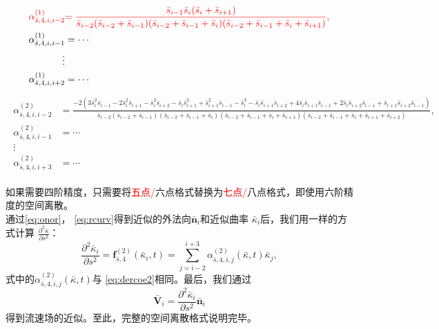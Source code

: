 \documentclass[a4paper,twoside]{ctexart}
\begin{document}
  \begin{footnotesize}
    \begin{eqnarray}
    \begin{aligned}
      \label{eq:dercoe1}      
  {\color{red} \alpha_{\bar{s},4,i,i-2}^{(1)} }&{\color{red} =
  \frac{\bar{s}_{i-1}\bar{s}_{i}(\bar{s}_{i}+\bar{s}_{i+1})}{\bar{s}_{i-2}(\bar{s}_{i-2}+\bar{s}_{i-1})(\bar{s}_{i-2}+\bar{s}_{i-1}+\bar{s}_{i})(\bar{s}_{i-2}+\bar{s}_{i-1}+\bar{s}_{i}+\bar{s}_{i+1})},}
  \\
  \alpha_{\bar{s},4,i,i-1}^{(1)} &= \cdots\\
  \vdots\\
  \alpha_{\bar{s},4,i,i+2}^{(1)} &= \cdots
\end{aligned}
  \end{eqnarray}
\begin{eqnarray}
\begin{aligned}
      \label{eq:dercoe2}
  \alpha_{\bar{s},4,i,i-2}^{(2)} &=
  \frac{-2(3\bar{s}_{i}^2\bar{s}_{i-1}\! -\!2\bar{s}_{i}^2\bar{s}_{i+1}\! -\!\bar{s}_{i}^2\bar{s}_{i+2}\! -\!\bar{s}_{i}\bar{s}_{i+1}^2\! +\!\bar{s}_{i+1}^2\bar{s}_{i-1}\! -\!\bar{s}_{i}^3\! -\!\bar{s}_{i}\bar{s}_{i+1}\bar{s}_{i+2}\! +\!4\bar{s}_{i}\bar{s}_{i+1}\bar{s}_{i-1}\! +\!2\bar{s}_{i}\bar{s}_{i+2}\bar{s}_{i-1}\! +\!\bar{s}_{i+1}\bar{s}_{i+2}\bar{s}_{i-1})}{\bar{s}_{i-2}(\bar{s}_{i-2}+\bar{s}_{i-1})(\bar{s}_{i-2}+\bar{s}_{i-1}+\bar{s}_{i})(\bar{s}_{i-2}+\bar{s}_{i-1}+\bar{s}_{i}+\bar{s}_{i+1})(\bar{s}_{i-2}+\bar{s}_{i-1}+\bar{s}_{i}+\bar{s}_{i+1}+\bar{s}_{i+2})},
  \\
  \alpha_{\bar{s},4,i,i-1}^{(2)} &= \cdots\\
  \vdots\\
  \alpha_{\bar{s},4,i,i+3}^{(2)} &= \cdots
  \end{aligned}                               
\end{eqnarray}
\end{footnotesize}
\indent 如果需要四阶精度，只需要将\textcolor{red}{五点/}六点格式替换为\textcolor{red}{七点/}八点格式，即使用六阶精度的空间离散。\\
\indent 通过\eqref{eq:onor}，
  \eqref{eq:rcurv}得到近似的外法向$\bar{\boldsymbol n}_i$和近似曲率
  $\bar{\kappa}_i$后，我们用一样的方式计算
  $\frac{\partial^2\kappa}{\partial s^2}$：
  \begin{equation}
    \label{eq:calderkappa}
    \frac{\partial^2\bar{\kappa}_i}{\partial s^2} =
    \boldsymbol f_{\bar{s},4}^{(2)}(\bar{\kappa}_i,t) = \sum_{j=i-2}^{i+3}\alpha_{\bar{s},4,i,j}^{(2)}(\bar{\kappa},t) \bar{\kappa}_j,
  \end{equation}
  式中的$\alpha_{\bar{s},4,i,j}^{(2)}(\bar{\kappa},t)$与
  \eqref{eq:dercoe2}相同。最后，我们通过
  \begin{equation}
    \label{eq:calv}
    \bar{\boldsymbol V}_i = \frac{\partial^2\bar{\kappa}_i}{\partial s^2}
    \bar{\boldsymbol n}_i
  \end{equation}
  得到流速场的近似。至此，完整的空间离散格式说明完毕。
\end{document}
